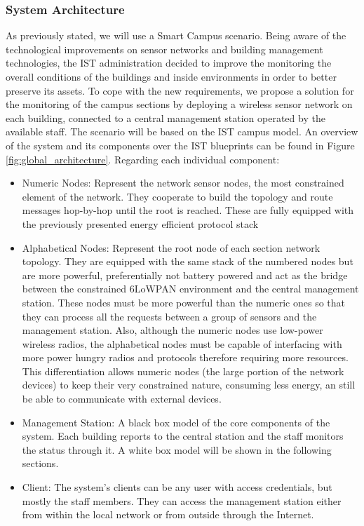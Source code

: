 \documentclass{sig-alternate-05-2015}
\begin{document}
\subsubsection{System Architecture}
As previously stated, we will use a Smart Campus scenario. Being aware of the technological improvements on sensor networks and building management technologies, the \gls{IST} administration decided to improve the monitoring the overall conditions of the buildings and inside environments in order to better preserve its assets. To cope with the new requirements, we propose a solution for the monitoring of the campus sections by deploying a wireless sensor network on each building, connected to a central management station operated by the available staff. The scenario will be based on the \gls{IST} campus model. An overview of the system and its components over the \gls{IST} blueprints can be found in Figure \ref{fig:global_architecture}. Regarding each individual component:

\begin{itemize}
	\item Numeric Nodes: Represent the network sensor nodes, the most constrained element of the network. They cooperate to build the topology and route messages hop-by-hop until the root is reached. These are fully equipped with the previously presented energy efficient protocol stack
	\item Alphabetical Nodes: Represent the root node of each section network topology. They are equipped with the same stack of the numbered nodes but are more powerful, preferentially not battery powered and act as the bridge between the constrained 6LoWPAN environment and the central management station. These nodes must be more powerful than the numeric ones so that they can process all the requests between a group of sensors and the management station. Also, although the numeric nodes use low-power wireless radios, the alphabetical nodes must be capable of interfacing with more power hungry radios and protocols therefore requiring more resources. This differentiation allows numeric nodes (the large portion of the network devices) to keep their very constrained nature, consuming less energy, an still be able to communicate with external devices.
	\item Management Station: A black box model of the core components of the system. Each building reports to the central station and the staff monitors the status through it. A white box model will be shown in the following sections.
	\item Client: The system's clients can be any user with access credentials, but mostly the staff members. They can access the management station either from within the local network or from outside through the Internet.
\end{itemize}
 
\end{document}
